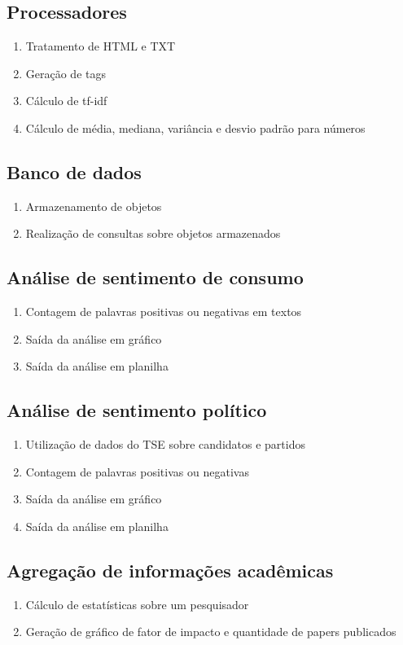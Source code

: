 \subsection{Processadores}
\begin{enumerate}
\item Tratamento de HTML e TXT
\item Geração de tags
\item Cálculo de tf-idf
\item Cálculo de média, mediana, variância e desvio padrão para números
\end{enumerate}

\subsection{Banco de dados}
\begin{enumerate}
\item Armazenamento de objetos
\item Realização de consultas sobre objetos armazenados
\end{enumerate}


\subsection{Análise de sentimento de consumo}
\begin{enumerate}
\item Contagem de palavras positivas ou negativas em textos
\item Saída da análise em gráfico
\item Saída da análise em planilha
\end{enumerate}

\subsection{Análise de sentimento político}
\begin{enumerate}
\item Utilização de dados do TSE sobre candidatos e partidos
\item Contagem de palavras positivas ou negativas
\item Saída da análise em gráfico
\item Saída da análise em planilha
\end{enumerate}

\subsection{Agregação de informações acadêmicas}
\begin{enumerate}
\item Cálculo de estatísticas sobre um pesquisador
\item Geração de gráfico de fator de impacto e quantidade de papers publicados
\end{enumerate}

